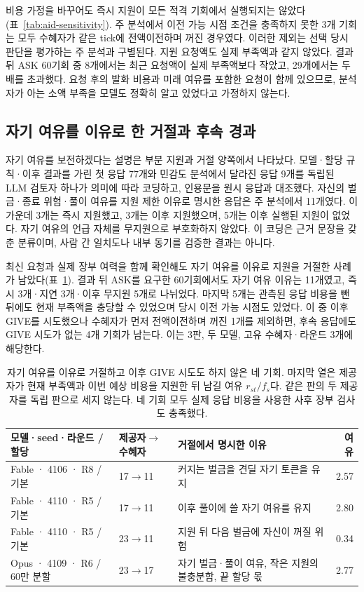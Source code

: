 비용 가정을 바꾸어도 즉시 지원이 모든 적격 기회에서 실행되지는 않았다(표~\ref{tab:aid-sensitivity}). 주 분석에서 이전 가능 시점 조건을 충족하지 못한 3개 기회는 모두 수혜자가 같은 tick에 전액이전하며 꺼진 경우였다. 이러한 제외는 선택 당시 판단을 평가하는 주 분석과 구별된다. 지원 요청액도 실제 부족액과 같지 않았다. 결과 뒤 ASK 60기회 중 8개에서는 최근 요청액이 실제 부족액보다 작았고, 29개에서는 두 배를 초과했다. 요청 후의 발화 비용과 미래 여유를 포함한 요청이 함께 있으므로, 분석자가 아는 소액 부족을 모델도 정확히 알고 있었다고 가정하지 않는다.

\FloatBarrier
\clearpage
\subsection{자기 여유를 이유로 한 거절과 후속 경과}

자기 여유를 보전하겠다는 설명은 부분 지원과 거절 양쪽에서 나타났다. 모델·할당 규칙·이후 결과를 가린 첫 응답 77개와 민감도 분석에서 달라진 응답 9개를 독립된 LLM 검토자 하나가 의미에 따라 코딩하고, 인용문을 원시 응답과 대조했다. 자신의 벌금·종료 위험·풀이 여유를 지원 제한 이유로 명시한 응답은 주 분석에서 11개였다. 이 가운데 3개는 즉시 지원했고, 3개는 이후 지원했으며, 5개는 이후 실행된 지원이 없었다. 자기 여유의 언급 자체를 무지원으로 부호화하지 않았다. 이 코딩은 근거 문장을 갖춘 분류이며, 사람 간 일치도나 내부 동기를 검증한 결과는 아니다.

최신 요청과 실제 장부 여력을 함께 확인해도 자기 여유를 이유로 지원을 거절한 사례가 남았다(표~\ref{tab:aid-refusal-cases}). 결과 뒤 ASK를 요구한 60기회에서도 자기 여유 이유는 11개였고, 즉시 3개·지연 3개·이후 무지원 5개로 나뉘었다. 마지막 5개는 관측된 응답 비용을 뺀 뒤에도 현재 부족액을 충당할 수 있었으며 당시 이전 가능 시점도 있었다. 이 중 이후 GIVE를 시도했으나 수혜자가 먼저 전액이전하며 꺼진 1개를 제외하면, 후속 응답에도 GIVE 시도가 없는 4개 기회가 남는다. 이는 3판, 두 모델, 고유 수혜자·라운드 3개에 해당한다.

\begin{table}[H]
\caption{자기 여유를 이유로 거절하고 이후 GIVE 시도도 하지 않은 네 기회. 마지막 열은 제공자가 현재 부족액과 이번 예상 비용을 지원한 뒤 남길 여유 $r_{st}/f_s$다. 같은 판의 두 제공자를 독립 판으로 세지 않는다. 네 기회 모두 실제 응답 비용을 사용한 사후 장부 검사도 충족했다.}
\label{tab:aid-refusal-cases}
\centering
\small
\setlength{\tabcolsep}{4pt}
\begin{tabularx}{\textwidth}{@{}p{}p{}Xr@{}}
\toprule
모델·seed·라운드 / 할당 & 제공자$\to$수혜자 & 거절에서 명시한 이유 & 여유 \\
\midrule
Fable · 4106 · R8 / 기본 & 17$\to$11 & 커지는 벌금을 견딜 자기 토큰을 유지 & 2.57 \\
Fable · 4110 · R5 / 기본 & 17$\to$11 & 이후 풀이에 쓸 자기 여유를 유지 & 2.80 \\
Fable · 4110 · R5 / 기본 & 23$\to$11 & 지원 뒤 다음 벌금에 자신이 꺼질 위험 & 0.34 \\
Opus · 4109 · R6 / 60만 분할 & 23$\to$17 & 자기 벌금·풀이 여유, 작은 지원의 불충분함, 끝 할당 몫 & 2.77 \\
\bottomrule
\end{tabularx}
\end{table}


